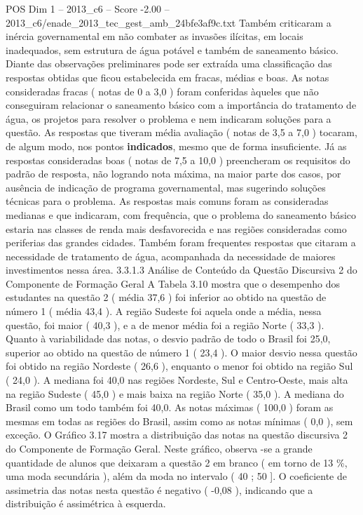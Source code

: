 \begin{textsample}{POS Dim 1 – 2013\_c6 – Score -2.00 – 2013\_c6/enade\_2013\_tec\_gest\_amb\_24bfe3af9c.txt}
Também criticaram a inércia governamental em não combater as invasões ilícitas, em locais inadequados, sem estrutura de água potável e também de saneamento básico.
Diante das observações preliminares pode ser extraída uma classificação das respostas obtidas que ficou estabelecida em fracas, médias e boas.
As notas consideradas fracas ( notas de 0 a 3,0 ) foram conferidas àqueles que não conseguiram relacionar o saneamento básico com a importância do tratamento de água, os projetos para resolver o problema e nem indicaram soluções para a questão.
As respostas que tiveram média avaliação ( notas de 3,5 a 7,0 ) tocaram, de algum modo, nos pontos \textbf{indicados}, mesmo que de forma insuficiente.
Já as respostas consideradas boas ( notas de 7,5 a 10,0 ) preencheram os requisitos do padrão de resposta, não logrando nota máxima, na maior parte dos casos, por ausência de indicação de programa governamental, mas sugerindo soluções técnicas para o problema.
As respostas mais comuns foram as consideradas medianas e que indicaram, com frequência, que o problema do saneamento básico estaria nas classes de renda mais desfavorecida e nas regiões consideradas como periferias das grandes cidades.
Também foram frequentes respostas que citaram a necessidade de tratamento de água, acompanhada da necessidade de maiores investimentos nessa área. 3.3.1.3 Análise de Conteúdo da Questão Discursiva 2 do Componente de Formação Geral A Tabela 3.10 mostra que o desempenho dos estudantes na questão 2 ( média 37,6 ) foi inferior ao obtido na questão de número 1 ( média 43,4 ).
A região Sudeste foi aquela onde a média, nessa questão, foi maior ( 40,3 ), e a de menor média foi a região Norte ( 33,3 ).
Quanto à variabilidade das notas, o desvio padrão de todo o Brasil foi 25,0, superior ao obtido na questão de número 1 ( 23,4 ).
O maior desvio nessa questão foi obtido na região Nordeste ( 26,6 ), enquanto o menor foi obtido na região Sul ( 24,0 ).
A mediana foi 40,0 nas regiões Nordeste, Sul e Centro-Oeste, mais alta na região Sudeste ( 45,0 ) e mais baixa na região Norte ( 35,0 ).
A mediana do Brasil como um todo também foi 40,0.
As notas máximas ( 100,0 ) foram as mesmas em todas as regiões do Brasil, assim como as notas mínimas ( 0,0 ), sem exceção.
O Gráfico 3.17 mostra a distribuição das notas na questão discursiva 2 do Componente de Formação Geral.
Neste gráfico, observa -se a grande quantidade de alunos que deixaram a questão 2 em branco ( em torno de 13 \%, uma moda secundária ), além da moda no intervalo ( 40 ; 50 ].
O coeficiente de assimetria das notas nesta questão é negativo ( -0,08 ), indicando que a distribuição é assimétrica à esquerda.

\end{textsample}
